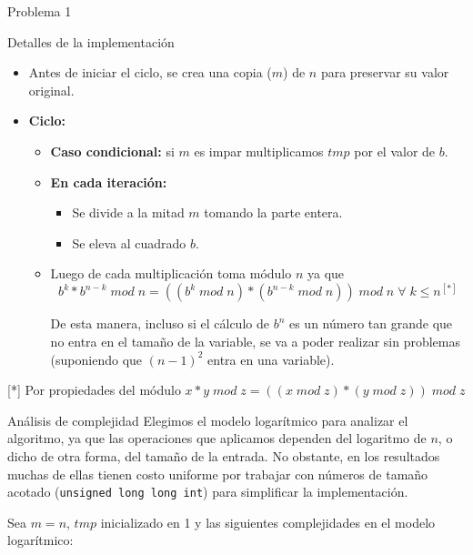 \begin{section}{Problema 1}
\begin{subsection}{Detalles de la implementación}
\begin{itemize}
			\item Antes de iniciar el ciclo, se crea una copia ($m$) de $n$ para preservar su valor original.

			\item \textbf{Ciclo:}
			\begin{itemize}
				
				\item \textbf{Caso condicional:} si $m$ es impar multiplicamos $tmp$ por el valor de $b$.
				
				\item \textbf{En cada iteración:}
				\begin{itemize}
					\item Se divide a la mitad $m$ tomando la parte entera.
					\item Se eleva al cuadrado $b$.
				\end{itemize}

				\item Luego de cada multiplicación toma módulo $n$ ya que
				$$b^k * b^{n-k}\; mod\;n = ((b^k\;mod\;n)*(b^{n-k}\;mod\;n))\;mod\;n\;\forall\;k\leq n ^{[*]}$$ 
	
				De esta manera, incluso si el cálculo de $b^n$ es un número tan grande que no entra en el 
				tamaño de la variable, se va a poder realizar sin problemas (suponiendo que $(n-1)^2$ entra 
				en una variable).

			\end{itemize}
		\end{itemize}
		
		\vspace{0.5cm}
		{\footnotesize [*] Por propiedades del módulo $x*y\; mod \; z = ((x\; mod\; z)*(y\; mod\; z))\;mod\; z$ } \\
		
	\end{subsection}



	\begin{subsection}{Análisis de complejidad}
		Elegimos el modelo logarítmico para analizar el algoritmo, ya que las operaciones que aplicamos dependen del logaritmo de $n$, o dicho de otra forma, del tamaño de la entrada. No obstante, en los resultados muchas de ellas tienen costo uniforme por trabajar con números de tamaño acotado (\texttt{unsigned long long int}) para simplificar la implementación.\Pa

		Sea $m = n$, $tmp$ inicializado en 1 y las siguientes complejidades en el modelo logarítmico:


\end{subsection}
\end{section}
